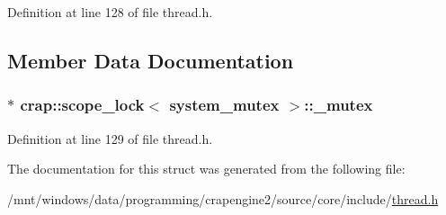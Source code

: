 Definition at line 128 of file thread.\+h.



\subsection{Member Data Documentation}
\hypertarget{structcrap_1_1scope__lock_3_01system__mutex_01_4_a3b2b0e888958844a834b7bde108c4b10}{}
\subsubsection[{\+\_\+mutex}]{$\ast$ {\bf crap\+::scope\+\_\+lock}$<$ {\bf system\+\_\+mutex} $>$\+::\+\_\+mutex}\label{structcrap_1_1scope__lock_3_01system__mutex_01_4_a3b2b0e888958844a834b7bde108c4b10}


Definition at line 129 of file thread.\+h.



The documentation for this struct was generated from the following file\+:\begin{DoxyCompactItemize}
\item 
/mnt/windows/data/programming/crapengine2/source/core/include/\hyperlink{thread_8h}{thread.\+h}\end{DoxyCompactItemize}
